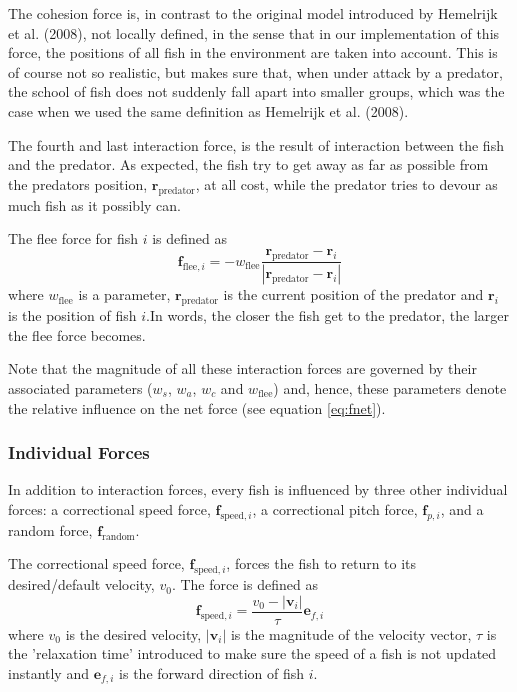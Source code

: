 \documentclass[11pt,a4paper]{article}
\begin{document}
The cohesion force is, in contrast to the original model introduced by Hemelrijk et al. (2008), not locally defined, in the sense that in our implementation of this force, the positions of all fish in the environment are taken into account. This is of course not so realistic, but makes sure that, when under attack by a predator, the school of fish does not suddenly fall apart into smaller groups, which was the case when we used the same definition as Hemelrijk et al. (2008). 

The fourth and last interaction force, is the result of interaction between the fish and the predator. As expected, the fish try to get away as far as possible from the predators position, $\mathbf{r}_\text{predator}$, at all cost, while the predator tries to devour as much fish as it possibly can.  

The flee force for fish $i$ is defined as
\begin{equation}
\mathbf{f}_{\text{flee}, i} = - w_\text{flee} \frac{\mathbf{r}_\text{predator} - \mathbf{r}_i}{\left|\mathbf{r}_\text{predator} - \mathbf{r}_i\right|}
\label{eq:flee}
\end{equation}
where $w_\text{flee}$ is a parameter, $\mathbf{r}_\text{predator}$ is the current position of the predator and $\mathbf{r}_i$ is the position of fish $i$.In words, the closer the fish get to the predator, the larger the flee force becomes. 

Note that the magnitude of all these interaction forces are governed by their associated parameters ($w_s$, $w_a$, $w_c$ and $w_\text{flee}$) and, hence, these parameters denote the relative influence on the net force (see equation \ref{eq:fnet}).  
 
\subsubsection{Individual Forces} \label{sec:non-interaction}
In addition to interaction forces, every fish is influenced by three other individual forces: a correctional speed force, $\mathbf{f}_{\text{speed}, i}$, a correctional pitch force, $\mathbf{f}_{p,i}$, and a random force, $\mathbf{f}_\text{random}$. 

The correctional speed force, $\mathbf{f}_{\text{speed}, i}$, forces the fish to return to its desired/default velocity, $v_0$. The force is defined as 
\begin{equation}
\mathbf{f}_{\text{speed}, i} = \frac{v_0 - |\mathbf{v}_i|}{\tau} \mathbf{e}_{f,i}
\label{eq:fspeed}
\end{equation}
where $v_0$ is the desired velocity, $|\mathbf{v}_i|$ is the magnitude of the velocity vector, $\tau$ is the 'relaxation time' introduced to make sure the speed of a fish is not updated instantly and $\mathbf{e}_{f,i}$ is the forward direction of fish $i$. 
\end{document}
